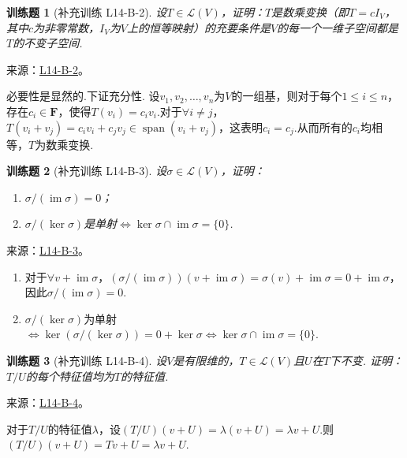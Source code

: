\documentclass[UTF8,12pt,a4paper,fontset=fandol]{ctexart}
\newtheorem{exercise}{训练题}[section]
\begin{document}
\begin{exercise}[补充训练 L14-B-2]\label{prob:L14-B-2}
设$T\in \mathcal{L}(V)$，证明：$T$是数乘变换（即$T=cI_V$，其中$c$为非零常数，$I_V$为$V$上的恒等映射）的充要条件是$V$的每一个一维子空间都是$T$的不变子空间.
\end{exercise}
\noindent 来源：\href{https://github.com/yhwu-is/Linear-Algebra-Left-Undone/blob/new/%E8%AE%B2%E4%B9%89/%E4%B8%93%E9%A2%98/14%20%E7%9B%B8%E4%BC%BC%E6%A0%87%E5%87%86%E5%BD%A2%EF%BC%9A%E5%8A%A8%E6%9C%BA%E4%B8%8E%E5%9F%BA%E7%A1%80.tex}{L14-B-2}。
\begin{solve}
必要性是显然的.下证充分性.
            设$v_1,v_2,\ldots,v_n$为$V$的一组基，则对于每个$1\leqslant i \leqslant n$，存在$c_i\in \mathbf{F}$，使得$T(v_i)=c_iv_i$.对于$\forall i\neq j$，$T(v_i+v_j)=c_iv_i+c_jv_j\in \operatorname{span}(v_i+v_j)$，这表明$c_i=c_j$.从而所有的$c_i$均相等，$T$为数乘变换.
\end{solve}

\begin{exercise}[补充训练 L14-B-3]\label{prob:L14-B-3}
设$\sigma\in \mathcal{L}(V)$，证明：
        \begin{enumerate}
            \item $\sigma/(\operatorname{im} \sigma)=0$；

            \item $\sigma/(\ker \sigma)$是单射$\iff \ker \sigma\cap\operatorname{im} \sigma=\{0\}$.
        \end{enumerate}
\end{exercise}
\noindent 来源：\href{https://github.com/yhwu-is/Linear-Algebra-Left-Undone/blob/new/%E8%AE%B2%E4%B9%89/%E4%B8%93%E9%A2%98/14%20%E7%9B%B8%E4%BC%BC%E6%A0%87%E5%87%86%E5%BD%A2%EF%BC%9A%E5%8A%A8%E6%9C%BA%E4%B8%8E%E5%9F%BA%E7%A1%80.tex}{L14-B-3}。
\begin{solve}
\begin{enumerate}
                \item 对于$\forall v+\operatorname{im}\sigma$，$(\sigma/(\operatorname{im}\sigma))(v+\operatorname{im}\sigma)=\sigma(v)+\operatorname{im}\sigma=0+\operatorname{im}\sigma$，因此$\sigma/(\operatorname{im}\sigma)=0$.
                \item $\sigma/(\ker\sigma)$为单射$\iff \ker(\sigma/(\ker\sigma))=0+\ker\sigma\iff \ker\sigma\cap\operatorname{im}\sigma=\{0\}$.
            \end{enumerate}
\end{solve}

\begin{exercise}[补充训练 L14-B-4]\label{prob:L14-B-4}
设$V$是有限维的，$T\in \mathcal{L}(V)$且$U$在$T$下不变. 证明：$T/U$的每个特征值均为$T$的特征值.
\end{exercise}
\noindent 来源：\href{https://github.com/yhwu-is/Linear-Algebra-Left-Undone/blob/new/%E8%AE%B2%E4%B9%89/%E4%B8%93%E9%A2%98/14%20%E7%9B%B8%E4%BC%BC%E6%A0%87%E5%87%86%E5%BD%A2%EF%BC%9A%E5%8A%A8%E6%9C%BA%E4%B8%8E%E5%9F%BA%E7%A1%80.tex}{L14-B-4}。
\begin{solve}
对于$T/U$的特征值$\lambda$，设$(T/U)(v+U)=\lambda(v+U)=\lambda v+U$.则$(T/U)(v+U)=Tv+U=\lambda v+U$.
\end{solve}
\end{document}
